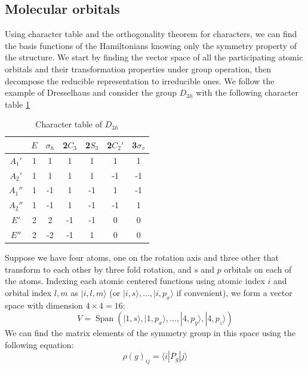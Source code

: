 \documentclass{article}
\DeclareMathOperator{\spn}{Span}
\begin{document}
\subsection{Molecular orbitals}
Using character table and the orthogonality theorem for characters, we can find the basis functions 
of the Hamiltonians knowing only the symmetry property of the structure. 
We start by finding the vector space of all the participating atomic orbitals and their transformation 
properties under group operation, then decompose the reducible representation to irreducible ones. 
We follow the example of Dresselhaus\cite{dresselhaus_group_2008} and consider the group $D_{3h}$ with 
the following character table \ref{T:ct}
\begin{table}[h!]
    \centering
    \caption{Character table of $D_{3h}$}
    \begin{tabular}{|c|c|c|c|c|c|c|}
                & $E$ & $\sigma_h$ & 2$C_3$ & 2$S_3$ & 2$C_2'$ & 3$\sigma_v$ \\ \hline
         $A_1'$ &  1  &  1         &  1     &  1     &   1     &   1         \\
         $A_2'$ &  1  &  1         &  1     &  1     &  -1     &  -1         \\
         $A_1''$&  1  & -1         &  1     & -1     &   1     &  -1         \\
         $A_2''$&  1  & -1         &  1     & -1     &  -1     &   1         \\
         $E'$   &  2  &  2         &  -1    & -1     &   0     &   0         \\
         $E''$  &  2  & -2         &  -1    &  1     &   0     &   0         \\ \hline
    \end{tabular}
    \label{T:ct}
\end{table}
Suppose we have four atoms, one on the rotation axis and three other that transform to each other 
by three fold rotation, and $s$ and $p$ orbitals on each of the atoms. Indexing each atomic 
centered functions using atomic index $i$ and orbital index $l,m$ as $| i,l,m \rangle$ 
(or $| i,s \rangle, \dots, |i,p_x\rangle$ if convenient), we form 
a vector space with dimension $4\times4 = 16$:
\begin{equation}
    V = \spn(| 1,s \rangle, | 1,p_x \rangle ,\dots, | 4,p_y \rangle, | 4,p_z \rangle)
\end{equation}
We can find the matrix elements of the symmetry group in this space using the following equation:
\begin{equation}
    \rho(g)_{ij} = \langle i | P_g | j \rangle
\end{equation}
\end{document}
